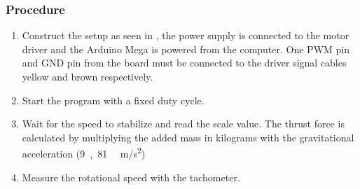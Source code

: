 \subsubsection{Procedure}
\begin{enumerate}
	\item Construct the setup as seen in , the power supply is connected to the motor driver and the Arduino Mega is powered from the computer. One PWM pin and GND pin from the board must be connected to the driver signal cables yellow and brown respectively. 
	\item Start the program with a fixed duty cycle.
	\item Wait for the speed to stabilize and read the scale value. The thrust force is calculated by multiplying the added mass in kilograms with the gravitational acceleration (\si{9,81\textbf{ }m/s^2})
	\item Measure the rotational speed with the tachometer.
\end{enumerate}


